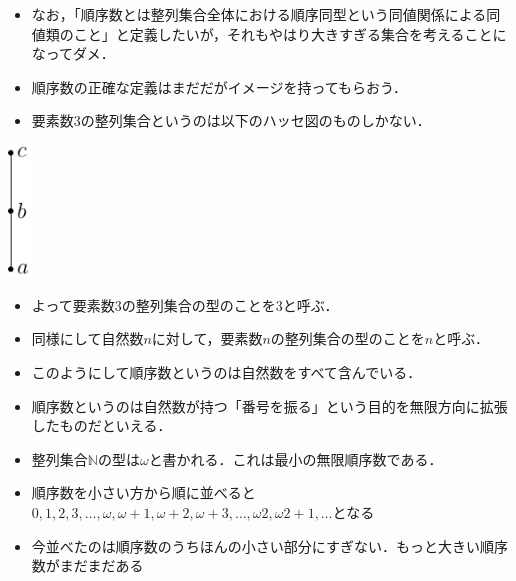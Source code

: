 \documentclass[dvipdfmx,17pt]{beamer}
\theoremstyle{plain}
\begin{document}
\begin{frame}
\begin{itemize}
\item なお，「順序数とは整列集合全体における順序同型という同値関係による同値類のこと」と定義したいが，それもやはり大きすぎる集合を考えることになってダメ．
\end{itemize}
\end{frame}

\begin{frame}
\begin{itemize}
\item 順序数の正確な定義はまだだがイメージを持ってもらおう．
\item 要素数$3$の整列集合というのは以下のハッセ図のものしかない．
\end{itemize}
\begin{center}\includegraphics[height=3.5cm]{3.pdf}\end{center}
\begin{itemize}
\item よって要素数$3$の整列集合の型のことを$3$と呼ぶ．

\end{itemize}
\end{frame}

\begin{frame}
\begin{itemize}
\item 同様にして自然数$n$に対して，要素数$n$の整列集合の型のことを$n$と呼ぶ．
 \item このようにして順序数というのは自然数をすべて含んでいる．
 \item 順序数というのは自然数が持つ「番号を振る」という目的を無限方向に拡張したものだといえる．
\end{itemize}
\end{frame}

\begin{frame}
\begin{itemize}
\item 整列集合$\mathbb{N}$の型は$\omega$と書かれる．これは最小の無限順序数である．
 \item 順序数を小さい方から順に並べると$0, 1, 2, 3, \dots, \omega, \omega+1, \omega+2, \omega+3, \dots, \omega2, \omega2 + 1, \dots$となる
 \item 今並べたのは順序数のうちほんの小さい部分にすぎない．もっと大きい順序数がまだまだある
\end{itemize}
\end{frame}
\end{document}
